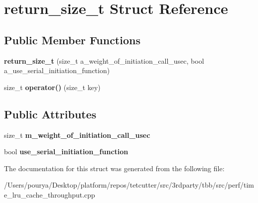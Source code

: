 \hypertarget{structreturn__size__t}{}\section{return\+\_\+size\+\_\+t Struct Reference}
\label{structreturn__size__t}
\subsection*{Public Member Functions}
\begin{DoxyCompactItemize}
\item 
\hypertarget{structreturn__size__t_a72929939df5a2ae1486ce0856f05b264}{}{\bfseries return\+\_\+size\+\_\+t} (size\+\_\+t a\+\_\+weight\+\_\+of\+\_\+initiation\+\_\+call\+\_\+usec, bool a\+\_\+use\+\_\+serial\+\_\+initiation\+\_\+function)\label{structreturn__size__t_a72929939df5a2ae1486ce0856f05b264}

\item 
\hypertarget{structreturn__size__t_ae9da1957fe42f4d15fd43401f1a32605}{}size\+\_\+t {\bfseries operator()} (size\+\_\+t key)\label{structreturn__size__t_ae9da1957fe42f4d15fd43401f1a32605}

\end{DoxyCompactItemize}
\subsection*{Public Attributes}
\begin{DoxyCompactItemize}
\item 
\hypertarget{structreturn__size__t_a01ca5a8b1cbca46c80ca057b1cac1496}{}size\+\_\+t {\bfseries m\+\_\+weight\+\_\+of\+\_\+initiation\+\_\+call\+\_\+usec}\label{structreturn__size__t_a01ca5a8b1cbca46c80ca057b1cac1496}

\item 
\hypertarget{structreturn__size__t_a7f2d13d89d0dfe520aa489b255ce9cb7}{}bool {\bfseries use\+\_\+serial\+\_\+initiation\+\_\+function}\label{structreturn__size__t_a7f2d13d89d0dfe520aa489b255ce9cb7}

\end{DoxyCompactItemize}


The documentation for this struct was generated from the following file\+:\begin{DoxyCompactItemize}
\item 
/\+Users/pourya/\+Desktop/platform/repos/tetcutter/src/3rdparty/tbb/src/perf/time\+\_\+lru\+\_\+cache\+\_\+throughput.\+cpp\end{DoxyCompactItemize}

